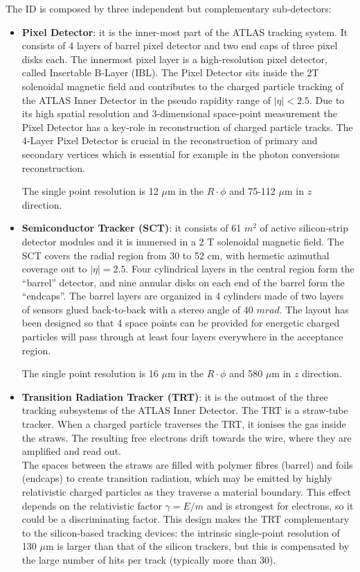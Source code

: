 \documentclass[a4paper, oneside]{book}
\begin{document}
					The ID is composed by three independent but complementary sub-detectors: 
					\begin{itemize}
						\item  \textbf{Pixel Detector}: \cite{ATLAS TDR} \cite{Inner Detector}
						it is  the  inner-most  part  of  the  ATLAS  tracking  system. It consists of 4 layers of barrel pixel detector and two end caps of three pixel disks each. The innermost pixel layer is a high-resolution pixel detector,  called Insertable B-Layer (IBL). The Pixel Detector sits inside the 2T solenoidal magnetic field and contributes to the charged particle tracking of the ATLAS Inner Detector in the pseudo rapidity range of $|\eta|<2.5$. Due to its high spatial resolution and 3-dimensional space-point measurement the Pixel Detector has a key-role in reconstruction of charged particle tracks.  The 4-Layer Pixel Detector is crucial in the reconstruction of primary and secondary vertices which is essential for example in the photon conversions reconstruction. 
						
						The single point resolution is 12 $\mu$m in the $R\cdot\phi$ and 75-112 $\mu$m in $z$ direction.
						\item \textbf{Semiconductor Tracker (SCT)}: \cite{ATLAS TDR} \cite{SCT}
						it consists of 61 $m^2$ of active silicon-strip detector modules and it is immersed in a 2 T solenoidal magnetic field. The  SCT  covers  the  radial  region  from  30  to  52  cm,  with  hermetic  azimuthal  coverage  out  to $|\eta|=2.5$. Four cylindrical layers in the central region form the “barrel” detector, and nine annular disks on each end of the barrel form the “endcaps”. The barrel layers are organized in 4 cylinders made of two layers of sensors glued back-to-back with a stereo angle of 40 $mrad$. The layout has been designed so that 4 space points can be provided for energetic charged particles will pass through at least four layers everywhere in the acceptance region. 
						
						The single point resolution is 16 $\mu$m in the $R\cdot\phi$ and 580 $\mu$m in $z$ direction.
						\item \textbf{Transition Radiation Tracker (TRT)}: \cite{ATLAS TDR} \cite{TRT}
						it is the outmost of the three tracking subsystems of the ATLAS Inner Detector. The TRT is a straw-tube tracker. When a charged particle traverses the TRT, it ionises the gas inside the straws. The resulting free electrons drift towards the wire, where they are amplified and read out.\\
						The spaces between the straws are filled with polymer fibres (barrel) and foils (endcaps) to create transition radiation, which may be emitted by highly relativistic charged particles as they traverse a material boundary.   This effect depends on the relativistic factor $\gamma=E/m$ and is strongest for electrons, so it could be a discriminating factor.
						This design  makes the TRT complementary to  the silicon-based tracking devices:  the intrinsic single-point resolution of 130 $\mu$m is larger than that of the silicon trackers, but this is compensated by the large number of hits per track (typically more than 30). 
					\end{itemize}
\end{document}
